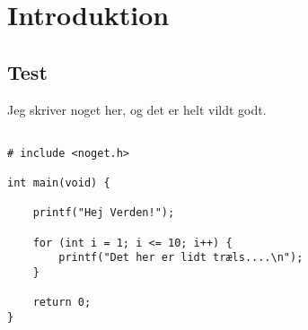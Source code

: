 \chapter{Introduktion}\label{ch:introduction}
\section{Test}

Jeg skriver noget her, og det er helt vildt godt.

\begin{verbatim}

# include <noget.h>

int main(void) {
    
    printf("Hej Verden!");
    
    for (int i = 1; i <= 10; i++) {
        printf("Det her er lidt træls....\n");
    }
    
    return 0;
}
\end{verbatim}